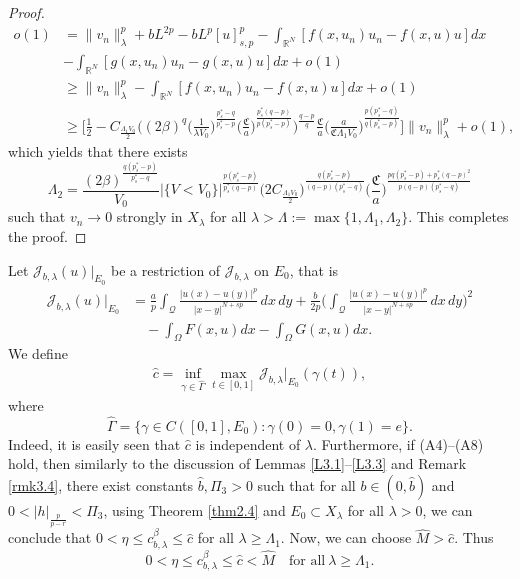 \documentclass[reqno]{amsart}
\begin{document}
\begin{proof}
\begin{align*}
o(1)&= \|v_n\|_\lambda^p+bL^{2p}-bL^p[u]^p_{s,p}
-\int_{\mathbb{R}^N}[f(x,u_n)u_n-f(x,u)u]dx  \\
&-\int_{\mathbb{R}^N}[g(x,u_n)u_n-g(x,u)u]dx +o(1)    \\
&\geq  \|v_n\|_\lambda^p-\int_{\mathbb{R}^N}[f(x,u_n)u_n-f(x,u)u]dx+o(1)  \\
&\geq  \Big[\frac{1}{2}-C_{\frac{\Lambda_1 V_0}{2}}\Big((2\beta)^q
 \Big(\frac{1}{\lambda V_0}\Big)^{\frac{p_s^*-q}{p_s^*-p}}
 \Big(\frac{\mathfrak{C}}{a}\Big)^{\frac{p_s^*(q-p)}{p(p_s^*-p)}}\Big)^{\frac{q-p}{q}}
 \frac{\mathfrak{C}}{a} \Big(\frac{a}{\mathfrak{C}\Lambda_1V_0}
 \Big)^{\frac{p(p^*_s-q)}{q(p^*_s-p)}}\Big]\|v_n\|_\lambda^p+o(1),
\end{align*}
which yields that there exists
$$
\Lambda_2=\frac{(2\beta)^{\frac{q(p^*_s-p)}{p^*_s-q}}}{V_0}
 |\{V<V_0\}|^{\frac{p(p^*_s-p)}{p^*_s(q-p)}}
\Big(2C_{\frac{\Lambda_1 V_0}{2}}\Big)^{\frac{q(p^*_s-p)}{(q-p)(p^*_s-q)}}
\Big(\frac{\mathfrak{C}}{a}\Big)^{\frac{pq(p_s^*-p)+p_s^*(q-p)^2}{p(q-p)(p_s^*-q)}}
$$
such that $v_n\to 0$ strongly in $X_\lambda$ for all 
$\lambda>\Lambda:=\max\{1, \Lambda_1, \Lambda_2\}$. This completes the proof.
\end{proof}

Let $\mathcal{J}_{b,\lambda}(u)|_{E_0}$ be a restriction of $\mathcal{J}_{b,\lambda}$ 
on $E_0$, that is
\begin{equation}\label{lab3.23}
\begin{split}
\mathcal{J}_{b,\lambda}(u)|_{E_0}
&=\frac{a}{p}\int_\mathcal{Q}
 \frac{|u(x)-u(y)|^p}{|x-y|^{N+sp}}\,dx\,dy
 +\frac{b}{2p}\Big(\int_\mathcal{Q}\frac{|u(x)-u(y)|^p}{|x-y|^{N+sp}}\,dx\,dy\Big)^2 \\
&\quad -\int_\Omega F(x, u)dx-\int_\Omega G(x, u)dx.
\end{split}
\end{equation}
We define
\begin{align*}
 \widehat{c}=\inf_{\gamma\in\widehat{\Gamma}}
 \max_{t\in[0,1]}  \mathcal{J}_{b,\lambda}|_{E_0} (\gamma(t)),
\end{align*}
where
\[
\widehat{\Gamma}=\{\gamma\in C([0,1],E_0):\gamma(0)=0, \gamma(1)=e\}.
\]
Indeed, it is easily seen that $\widehat{c}$ is independent of $\lambda$. 
Furthermore, if (A4)--(A8) hold, then similarly to the discussion of
 Lemmas \ref{L3.1}--\ref{L3.3} and Remark \ref{rmk3.4}, there exist constants 
$\widehat{b}, \Pi_3>0$ such that for all $b\in(0, \widehat{b})$ and 
$0<|h|_{\frac{p}{p-r}}<\Pi_3$, using Theorem \ref{thm2.4} and 
$E_0\subset X_\lambda$ for all $\lambda>0$, we can conclude that 
$0<\eta\leq c_{b,\lambda}^\beta\leq \widehat{c}$ for all $\lambda\geq\Lambda_1$. 
Now, we can choose $\widehat{M}>\widehat{c}$. Thus
\begin{equation}\label{lab3.24}
0<\eta\leq c_{b,\lambda}^\beta\leq \widehat{c}<\widehat{M}\quad
 \text{for all}\ \lambda\geq\Lambda_1.
\end{equation}
\end{document}
